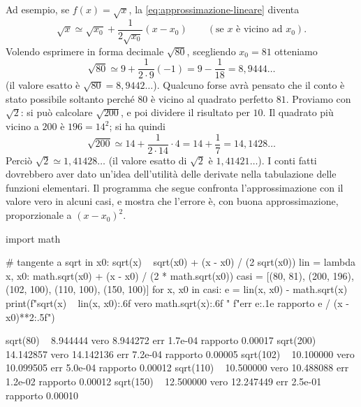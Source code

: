 Ad esempio, se $f(x)=\sqrt x$, la \eqref{eq:approssimazione-lineare} diventa
\begin{equation}\label{eq:approssimazione-radice}
  \sqrt x\simeq\sqrt{x_{0}}+\frac1{2\sqrt{x_{0}}}(x-x_{0}) \qquad(\text{se } x \text{ è vicino ad } x_{0}).
\end{equation}
Volendo esprimere in forma decimale $\sqrt{80}$, scegliendo $x_{0}=81$ otteniamo
\begin{equation}\label{eq:radice-80}
  \sqrt{80}\simeq9+\frac1{2\cdot9}(-1)=9-\frac1{18}=8{,}9444\ldots
\end{equation}
(il valore esatto è $\sqrt{80}=8{,}9442\ldots$). Qualcuno forse avrà pensato che il conto
è stato possibile soltanto perché $80$ è vicino al quadrato perfetto $81$. Proviamo con
$\sqrt2$: si può calcolare $\sqrt{200}$, e poi dividere il risultato per $10$. Il quadrato
più vicino a $200$ è $196=14^{2}$; si ha quindi
\begin{equation}\label{eq:radice-200}
  \sqrt{200}\simeq14+\frac1{2\cdot14}\cdot4=14+\frac17=14{,}1428\ldots
\end{equation}
Perciò $\sqrt2\simeq1{,}41428\ldots$ (il valore esatto di $\sqrt2$ è $1{,}41421\ldots$). I
conti fatti dovrebbero aver dato un'idea dell'utilità delle derivate nella tabulazione
delle funzioni elementari. Il programma che segue confronta l'approssimazione con il
valore vero in alcuni casi, e mostra che l'errore è, con buona approssimazione,
proporzionale a $(x-x_{0})^{2}$.

\begin{python}
import math

# tangente a sqrt in x0: sqrt(x) ~ sqrt(x0) + (x - x0) / (2 sqrt(x0))
lin = lambda x, x0: math.sqrt(x0) + (x - x0) / (2 * math.sqrt(x0))
casi = [(80, 81), (200, 196), (102, 100), (110, 100), (150, 100)]
for x, x0 in casi:
    e = lin(x, x0) - math.sqrt(x)
    print(f"sqrt({x}) ~ {lin(x, x0):.6f}  vero {math.sqrt(x):.6f}  "
          f"err {e:.1e}  rapporto {e / (x - x0)**2:.5f}")
\end{python}
\begin{risultato}
sqrt(80) ~ 8.944444  vero 8.944272  err 1.7e-04  rapporto 0.00017
sqrt(200) ~ 14.142857  vero 14.142136  err 7.2e-04  rapporto 0.00005
sqrt(102) ~ 10.100000  vero 10.099505  err 5.0e-04  rapporto 0.00012
sqrt(110) ~ 10.500000  vero 10.488088  err 1.2e-02  rapporto 0.00012
sqrt(150) ~ 12.500000  vero 12.247449  err 2.5e-01  rapporto 0.00010
\end{risultato}

